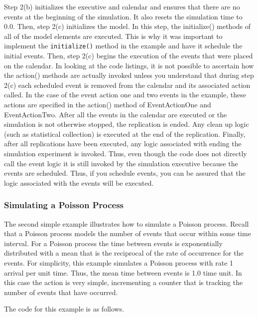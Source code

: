 \documentclass[
]{book}
\theoremstyle{definition}
\theoremstyle{definition}
\theoremstyle{definition}
\theoremstyle{definition}
\theoremstyle{remark}
\begin{document}
Step 2(b) initializes the executive and calendar and ensures that there
are no events at the beginning of the simulation. It also resets the
simulation time to 0.0. Then, step 2(c) initializes the model. In this
step, the initialize() methods of all of the model elements are
executed. This is why it was important to implement the \texttt{initialize()}
method in the example and have it schedule the initial events. Then,
step 2(c) begins the execution of the events that were placed on the
calendar. In looking at the code listings, it is not possible to ascertain how the action() methods are actually invoked unless you
understand that during step 2(c) each scheduled event is removed from
the calendar and its associated action called. In the case of the event action one
and two events in the example, these actions are specified in the action() method of EventActionOne and EventActionTwo. After all the events in the
calendar are executed or the simulation is not otherwise stopped, the
replication is ended. Any clean up logic (such as statistical
collection) is executed at the end of the replication. Finally, after
all replications have been executed, any logic associated with ending
the simulation experiment is invoked. Thus, even though the code does
not directly call the event logic it is still invoked by the simulation
executive because the events are scheduled. Thus, if you schedule
events, you can be assured that the logic associated with the events
will be executed.

\hypertarget{simulating-a-poisson-process}{%
\subsubsection{Simulating a Poisson Process}\label{simulating-a-poisson-process}}

The second simple example illustrates how to simulate a Poisson process.
Recall that a Poisson process models the number of events that occur
within some time interval. For a Poisson process the time between events
is exponentially distributed with a mean that is the reciprocal of the
rate of occurrence for the events. For simplicity, this example
simulates a Poisson process with rate 1 arrival per unit time. Thus, the
mean time between events is 1.0 time unit. In this case the action is very simple, incrementing a counter that is tracking the number of events that have
occurred.

The code for this example is as follows.
\end{document}
